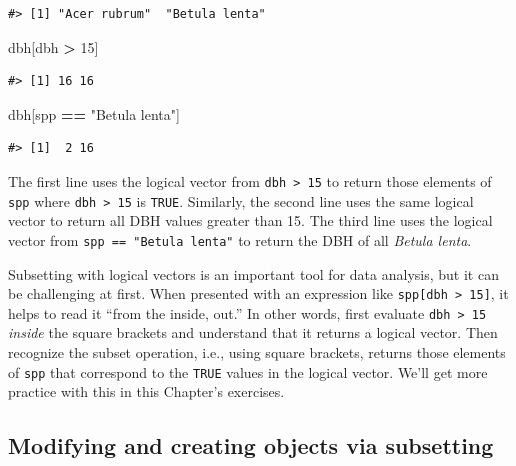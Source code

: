 \documentclass[
  11pt,
]{krantz}
\newenvironment{Shaded}{\begin{snugshade}}{\end{snugshade}}
\newcommand{\DecValTok}[1]{\textcolor[rgb]{0.00,0.00,0.81}{#1}}
\newcommand{\NormalTok}[1]{#1}
\newcommand{\OperatorTok}[1]{\textcolor[rgb]{0.81,0.36,0.00}{\textbf{#1}}}
\newcommand{\StringTok}[1]{\textcolor[rgb]{0.31,0.60,0.02}{#1}}
\theoremstyle{definition}
\theoremstyle{definition}
\theoremstyle{definition}
\theoremstyle{definition}
\theoremstyle{remark}
\begin{document}
\begin{verbatim}
#> [1] "Acer rubrum"  "Betula lenta"
\end{verbatim}

\begin{Shaded}
\begin{Highlighting}[]
\NormalTok{dbh[dbh }\OperatorTok{\textgreater{}}\StringTok{ }\DecValTok{15}\NormalTok{]}
\end{Highlighting}
\end{Shaded}

\begin{verbatim}
#> [1] 16 16
\end{verbatim}

\begin{Shaded}
\begin{Highlighting}[]
\NormalTok{dbh[spp }\OperatorTok{==}\StringTok{ "Betula lenta"}\NormalTok{]}
\end{Highlighting}
\end{Shaded}

\begin{verbatim}
#> [1]  2 16
\end{verbatim}

The first line uses the logical vector from \texttt{dbh\ \textgreater{}\ 15} to return those elements of \texttt{spp} where \texttt{dbh\ \textgreater{}\ 15} is \texttt{TRUE}. Similarly, the second line uses the same logical vector to return all DBH values greater than 15. The third line uses the logical vector from \texttt{spp\ ==\ "Betula\ lenta"} to return the DBH of all \emph{Betula lenta}.

Subsetting with logical vectors is an important tool for data analysis, but it can be challenging at first. When presented with an expression like \texttt{spp{[}dbh\ \textgreater{}\ 15{]}}, it helps to read it ``from the inside, out.'' In other words, first evaluate \texttt{dbh\ \textgreater{}\ 15} \emph{inside} the square brackets and understand that it returns a logical vector. Then recognize the subset operation, i.e., using square brackets, returns those elements of \texttt{spp} that correspond to the \texttt{TRUE} values in the logical vector. We'll get more practice with this in this Chapter's exercises.

\hypertarget{modifySubsetting}{%
\subsection{Modifying and creating objects via subsetting}\label{modifySubsetting}}
\end{document}

